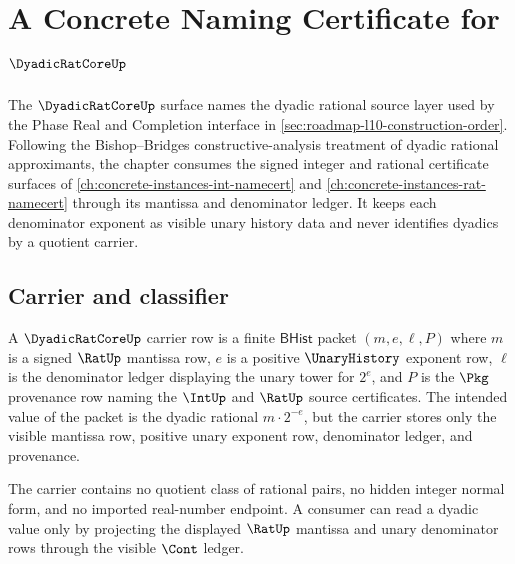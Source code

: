 \chapter{A Concrete Naming Certificate for $\DyadicRatCoreUp$}
\label{ch:concrete-instances-dyadicratcore-namecert}

The $\DyadicRatCoreUp$ surface names the dyadic rational source layer used by
the Phase Real and Completion interface in \autoref{sec:roadmap-l10-construction-order}.
Following the Bishop--Bridges constructive-analysis treatment of dyadic
rational approximants, the chapter consumes the signed integer and rational
certificate surfaces of \autoref{ch:concrete-instances-int-namecert} and
\autoref{ch:concrete-instances-rat-namecert} through its mantissa and
denominator ledger. It keeps each denominator exponent as visible unary
history data and never identifies dyadics by a quotient carrier.

\section{Carrier and classifier}
\label{sec:dyadicratcore-carrier}

\begin{definition}
\label{def:dyadicratcore-carrier}
A $\DyadicRatCoreUp$ carrier row is a finite $\mathsf{BHist}$ packet
$(m,e,\ell,P)$ where $m$ is a signed $\RatUp$ mantissa row, $e$ is a positive
$\UnaryHistory$ exponent row, $\ell$ is the denominator ledger displaying the
unary tower for $2^e$, and $P$ is the $\Pkg$ provenance row naming the
$\IntUp$ and $\RatUp$ source certificates. The intended value of the packet is
the dyadic rational $m\cdot 2^{-e}$, but the carrier stores only the visible
mantissa row, positive unary exponent row, denominator ledger, and provenance.

The carrier contains no quotient class of rational pairs, no hidden integer
normal form, and no imported real-number endpoint. A consumer can read a
dyadic value only by projecting the displayed $\RatUp$ mantissa and unary
denominator rows through the visible $\Cont$ ledger.
\end{definition}

